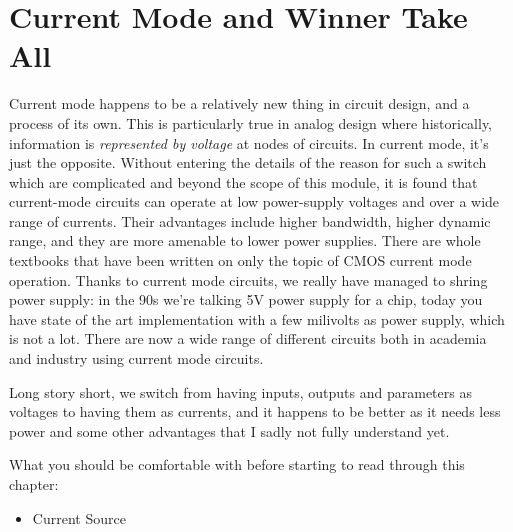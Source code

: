 \section{Current Mode and Winner Take All}

Current mode happens to be a relatively new thing in circuit design, and a process of its own. This is particularly true in analog design where historically, information is \textit{represented by voltage} at nodes of circuits. In current mode, it's just the opposite. Without entering the details of the reason for such a switch which are complicated and beyond the scope of this module, it is found that current-mode circuits can operate at low power-supply voltages and over a wide range of currents. Their advantages include higher bandwidth, higher dynamic range, and they are more amenable to lower power
supplies. There are whole textbooks that have been written on only the topic of CMOS current mode operation. Thanks to current mode circuits, we really have managed to shring power supply: in the 90s we're talking 5V power supply for a chip, today you have state of the art implementation with a few milivolts as power supply, which is not a lot. There are now a wide range of different circuits both in academia and industry using current mode circuits. 

Long story short, we switch from having inputs, outputs and parameters as voltages to having them as currents, and it happens to be better as it needs less power and some other advantages that I sadly not fully understand yet. 

What you should be comfortable with before starting to read through this chapter: 

\begin{itemize}
    \item Current Source
\end{itemize}










